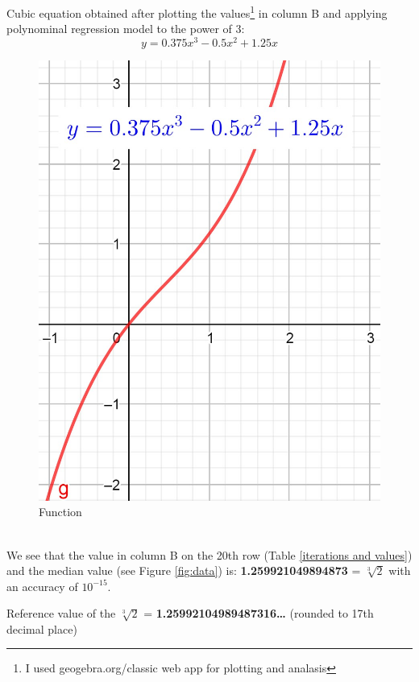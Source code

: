 \documentclass[12pt, letterpaper, oneside]{report}
\begin{document}
Cubic equation obtained after plotting the values\footnote{I used geogebra.org/classic web app for plotting and analasis } in column B and applying polynominal regression model to the power of 3:
\begin{equation}
y=0.375x^{3}-0.5x^{2}+1.25x
\end{equation}
\begin{figure}[h]
	\centering
	\includegraphics[width=0.2\linewidth]{g_x_func.jpg}
	\caption{Function}
	\label{fig:function}
\end{figure}\\
\newpage
We see that the value in column B on the 20th row (Table   \ref{iterations and values}) and the median value (see Figure \ref{fig:data}) is:  \textbf{1.259921049894873} = $\sqrt[3]{2}$ with an accuracy of $10^{-15}$.
\vspace{10pt}
\\
\begin{center}
	Reference value of the $\sqrt[3]{2}$ = \textbf{1.25992104989487316…} (rounded to 17th decimal place)
\end{center}
\vspace{10pt}


\end{document}
